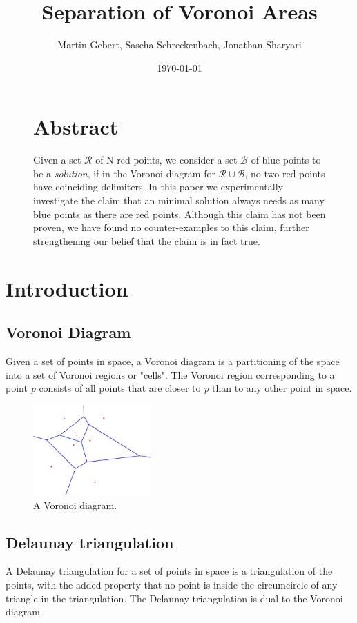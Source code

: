 \documentclass[a4paper,12pt]{article}
\title{\textbf{Separation of Voronoi Areas}}
\author{Martin Gebert, Sascha Schreckenbach, Jonathan Sharyari}  %
\date{\today}
\begin{document}
\maketitle

\begin{figure}
\section*{\large Abstract}
Given a set $\mathcal{R}$ of N red points, we consider a set  $\mathcal{B}$ of blue points to be a \emph{solution}, if in the Voronoi diagram for  $\mathcal{R}\cup\mathcal{B}$, no two red points have coinciding delimiters. In this paper we experimentally investigate the claim that an minimal solution always needs as many blue points as there are red points. Although this claim has not been proven, we have found no counter-examples to this claim, further strengthening our belief that the claim is in fact true.
\end{figure}
\newpage

\tableofcontents
\newpage

\section{Introduction}
\subsection{Voronoi Diagram}
Given a set of points in space, a Voronoi diagram is a partitioning of the space into a set of Voronoi regions or "cells". The Voronoi region corresponding to a point \emph{p} consists of all points that are closer to \emph{p} than to any other point in space.

\begin{figure}[hb]
\centering
\includegraphics[width=0.4\textwidth]{pictures/Voronoi-diagram.png}
 \caption[Close up of \textit{Hemidactylus} sp.]
{A Voronoi diagram.}
\end{figure}

\subsection{Delaunay triangulation}
A Delaunay triangulation for a set of points in space is a triangulation of the points, with the added property that no point is inside the circumcircle of any triangle in the triangulation. \newline
The Delaunay triangulation is dual to the Voronoi diagram. 
\end{document}
